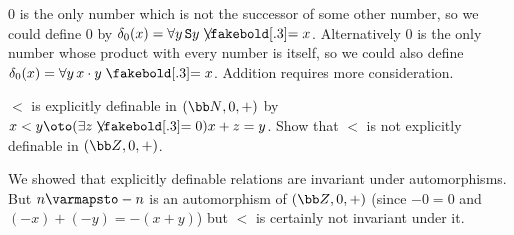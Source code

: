 \eexerc

$0$ is the only number which is not the successor of some other number, so we could define $0$ by $\delta_0(x)=\forall y\,{\tt S}y\neqb x$.
Alternatively $0$ is the only number whose product with every number is itself, so we could also define $\delta_0(x)=\forall y\,x\cdot y\eq x$.
Addition requires more consideration.

\bexerc

    $<$ is explicitly definable in $({\bb N},0,+)$ by $x<y\oto(\exists z\neqb0)x+z=y$.
    Show that $<$ is not explicitly definable in $({\bb Z},0,+)$.

\eexerc

We showed that explicitly definable relations are invariant under automorphisms.
But $n\varmapsto-n$ is an automorphism of $({\bb Z},0,+)$ (since $-0=0$ and $(-x)+(-y)=-(x+y)$) but $<$ is certainly not invariant under it.

